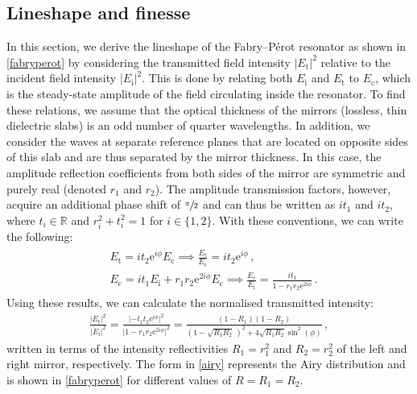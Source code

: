 \documentclass[../Thesis-IJspeert.tex]{subfiles}
\begin{document}
\subsection{Lineshape and finesse}
In this section, we derive the lineshape of the Fabry--Pérot resonator as shown in \autoref{fabryperot} by considering the transmitted field intensity ${\lvert E_\mathrm{t}\rvert^2}$ relative to the incident field intensity ${\lvert E_\mathrm{i}\rvert^2}$. This is done by relating both $ E_\mathrm{i}$ and $ E_\mathrm{t}$ to $ E_\mathrm{c}$, which is the steady-state amplitude of the field circulating inside the resonator. To find these relations, we assume that the optical thickness of the mirrors (lossless, thin dielectric slabs) is an odd number of quarter wavelengths. In addition, we consider the waves at separate reference planes that are located on opposite sides of this slab and are thus separated by the mirror thickness. In this case, the amplitude reflection coefficients from both sides of the mirror are symmetric and purely real (denoted $r_1$ and $r_2$). The amplitude transmission factors, however, acquire an additional phase shift of $\sfrac{\pi}{2}$ and can thus be written as $it_1$ and $it_2$, where $t_i\in \mathbb{R}$ and $r_i^2+t_i^2=1$ for $i\in \{ 1,2\}$. With these conventions, we can write the following:
\begin{align}
	\begin{split}
		&E_\mathrm{t}= it_2 \mathrm{e}^{i\phi} E_\mathrm{c} \implies \frac{E_\mathrm{t}}{E_\mathrm{c}} = it_2 \mathrm{e}^{i\phi}\,,\\
		&E_\mathrm{c}= it_1 E_\mathrm{i} + r_1 r_2 \mathrm{e}^{2i\phi} E_\mathrm{c} \implies \frac{E_\mathrm{c}}{E_\mathrm{i}} = \frac{it_1}{1-r_1 r_2 \mathrm{e}^{2i\phi}} \,.
	\end{split}
\end{align}
Using these results, we can calculate the normalised transmitted intensity:
\begin{align}
	\label{airy}
	\frac{\lvert E_\mathrm{t}\rvert^2}{\lvert E_\mathrm{i}\rvert^2} = \frac{\lvert -t_1 t_2 \mathrm{e}^{i\phi}\rvert^2}{\lvert 1-r_1 r_2\mathrm{e}^{2i\phi}\rvert^2}=\frac{(1-R_1)(1-R_2)}{\left(1-\sqrt{R_1R_2}\,\right)^2 + 4\sqrt{R_1R_2}\sin^2(\phi)}\,,
\end{align}
written in terms of the intensity reflectivities $R_1=r_1^2$ and $R_2=r_2^2$ of the left and right mirror, respectively. The form in \autoref{airy} represents the Airy distribution and is shown in \autoref{fabryperot} for different values of $R=R_1=R_2$.
\end{document}
